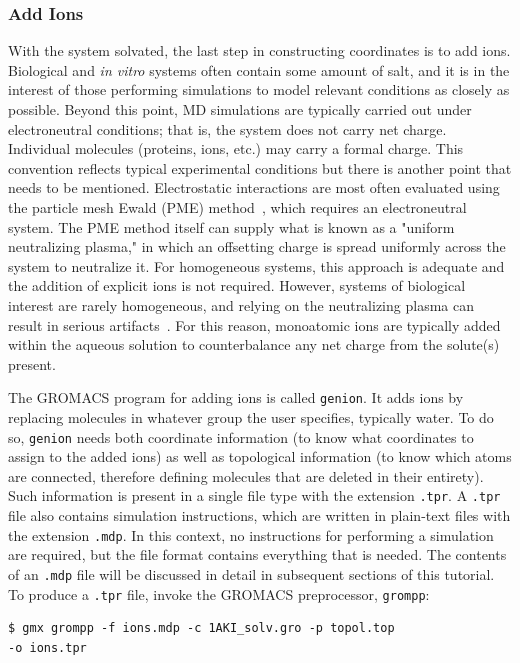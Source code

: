 \documentclass[9pt,tutorial]{livecoms}
\begin{document}
\subsubsection{Add Ions} \label{lyso_ions}

With the system solvated, the last step in constructing coordinates is to add ions. Biological and {\em in vitro} systems often contain some amount of salt, and it is in the interest of those performing simulations to model relevant conditions as closely as possible. Beyond this point, MD simulations are typically carried out under electroneutral conditions; that is, the system does not carry net charge. Individual molecules (proteins, ions, etc.) may carry a formal charge. This convention reflects typical experimental conditions but there is another point that needs to be mentioned. Electrostatic interactions are most often evaluated using the particle mesh Ewald (PME) method~\cite{Darden1993,Essmann1995}, which requires an electroneutral system. The PME method itself can supply what is known as a "uniform neutralizing plasma," in which an offsetting charge is spread uniformly across the system to neutralize it. For homogeneous systems, this approach is adequate and the addition of explicit ions is not required. However, systems of biological interest are rarely homogeneous, and relying on the neutralizing plasma can result in serious artifacts~\cite{Hub2014}. For this reason, monoatomic ions are typically added within the aqueous solution to counterbalance any net charge from the solute(s) present.

The GROMACS program for adding ions is called \texttt{genion}. It adds ions by replacing molecules in whatever group the user specifies, typically water. To do so, \texttt{genion} needs both coordinate information (to know what coordinates to assign to the added ions) as well as topological information (to know which atoms are connected, therefore defining molecules that are deleted in their entirety). Such information is present in a single file type with the extension \texttt{.tpr}. A \texttt{.tpr} file also contains simulation instructions, which are written in plain-text files with the extension \texttt{.mdp}. In this context, no instructions for performing a simulation are required, but the file format contains everything that is needed. The contents of an \texttt{.mdp} file will be discussed in detail in subsequent sections of this tutorial. To produce a \texttt{.tpr} file, invoke the GROMACS preprocessor, \texttt{grompp}:

\begin{verbatim}
$ gmx grompp -f ions.mdp -c 1AKI_solv.gro -p topol.top 
-o ions.tpr
\end{verbatim}
\end{document}
